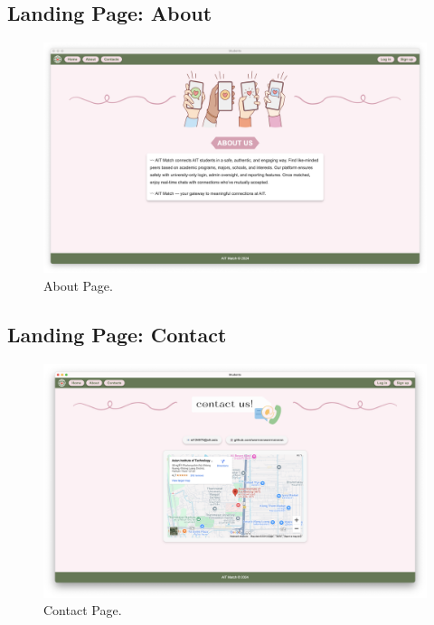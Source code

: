         \subsection{Landing Page: About}
        \begin{figure}[h]
                \centering
                \captionsetup{justification=centering, singlelinecheck=false, labelsep=space}
                \includegraphics[width=5in]{figures/results/landing-page/about-page.png} 
                \caption{About Page.}
                \label{fig:about-page}
            \end{figure}  

        \newpage
        \subsection{Landing Page: Contact}
        \begin{figure}[h]
                \centering
                \captionsetup{justification=centering, singlelinecheck=false, labelsep=space}
                \includegraphics[width=5in]{figures/results/landing-page/contact-page.png} 
                \caption{Contact Page.}
                \label{fig:contact-page}
            \end{figure}  
        \newpage
